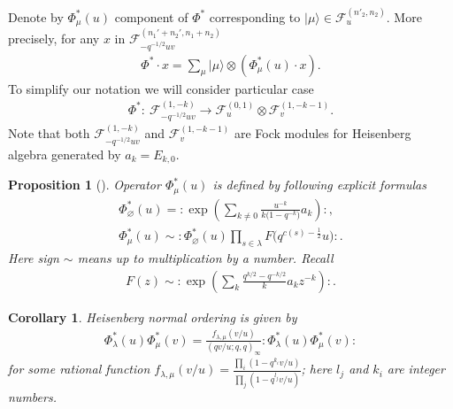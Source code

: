 \documentclass[pdftex]{sigma}
\numberwithin{equation}{section}
\newtheorem{Proposition}[Theorem]{Proposition}
\newtheorem{Corollary}[Theorem]{Corollary}
\theoremstyle{definition}
\begin{document}
Denote by $\Phi^*_{\mu}(u)$ component of $\Phi^*$ corresponding to $| \mu \rangle \in \mathcal{F}_{u}^{(n'_2,n_2)}$. More precisely, for any $x$ in $\mathcal{F}_{- q^{-1/2} uv}^{(n_1'+n_2', n_1+n_2)}$
\begin{gather*}
\Phi^* \cdot x = \sum_{\mu} | \mu \rangle \otimes ( \Phi_{\mu}^*(u) \cdot x ).
\end{gather*}
To simplify our notation we will consider particular case
\begin{gather*}
\Phi^* \colon \ \mathcal{F}_{- q^{-1/2} uv}^{(1, -k)} \rightarrow \mathcal{F}_{u}^{(0,1)} \otimes \mathcal{F}_{v}^{(1,-k-1)}.
\end{gather*}
Note that both $\mathcal{F}_{- q^{-1/2} uv}^{(1, -k)}$ and $\mathcal{F}_{v}^{(1,-k-1)}$ are Fock modules for Heisenberg algebra generated by $a_k = E_{k,0}$.
\begin{Proposition}[\cite{AFS}] Operator $\Phi_{\mu}^* (u)$ is defined by following explicit formulas
\begin{gather*}
\Phi_{\varnothing}^* (u) = {: \! \exp \left( \sum_{k \neq 0} \frac{u^{-k}}{k\big(1-q^{-k}\big)} a_{k} \right) \! :},\\
\Phi_{\mu}^* (u) \sim {: \! \Phi_{\varnothing}^* (u) \prod_{s \in \lambda} \! F\big(q^{c(s)-\frac12} u\big):}.
\end{gather*}
Here sign $\sim$ means up to multiplication by a number. Recall
\begin{gather*}
F(z) \sim {: \! \exp \left( \sum_k \frac{ q^{k/2}-q^{-k/2} }{k} a_k z^{-k} \right) \! :.}
\end{gather*}
\end{Proposition}

\begin{Corollary} \label{corol: Phi norm order}Heisenberg normal ordering is given by
\begin{gather*}
\Phi^*_{\lambda}(u) \Phi^*_{\mu}(v) = \frac{f_{\lambda, \mu}(v/u)}{(q v/u; q, q)_{\infty}} : \! \Phi^*_{\lambda}(u) \Phi^*_{\mu}(v) \! :
\end{gather*}
for some rational function $f_{\lambda, \mu}(v/u) = \frac{\prod_{i} (1-q^{k_i} v/u) }{\prod_{j} (1-q^{l_j} v/u)}$; here $l_j$ and $k_i$ are integer numbers.
\end{Corollary}
\end{document}
